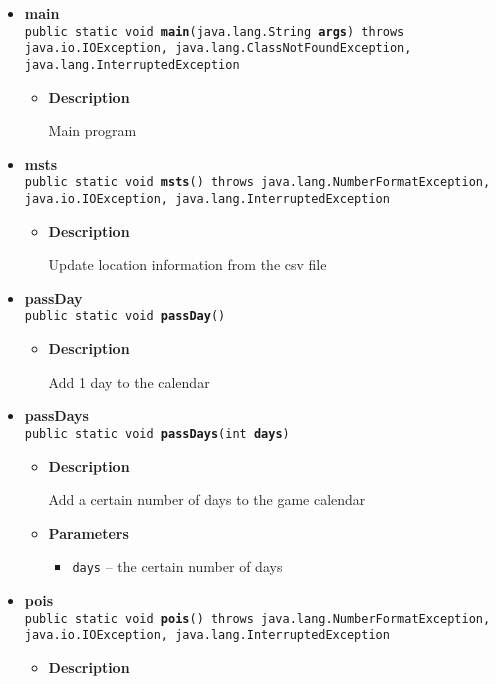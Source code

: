{{{{{{\begin{itemize}
{\begin{itemize}
{Update location information from the csv file
}
\end{itemize}
}%
\item{ 
{\bf  main}\\
\texttt{public static void\ {\bf  main}(\texttt{java.lang.String\lbrack \rbrack } {\bf  args}) throws java.io.IOException, java.lang.ClassNotFoundException, java.lang.InterruptedException
\label{personOfInterest.Game.main(java.lang.String[])}}%
\begin{itemize}
\item{
{\bf  Description}

Main program
}
\end{itemize}
}%
\item{ 
{\bf  msts}\\
\texttt{public static void\ {\bf  msts}() throws java.lang.NumberFormatException, java.io.IOException, java.lang.InterruptedException
\label{personOfInterest.Game.msts()}}%
\begin{itemize}
\item{
{\bf  Description}

Update location information from the csv file
}
\end{itemize}
}%
\item{ 
{\bf  passDay}\\
\texttt{public static void\ {\bf  passDay}()
\label{personOfInterest.Game.passDay()}}%
\begin{itemize}
\item{
{\bf  Description}

Add 1 day to the calendar
}
\end{itemize}
}%
\item{ 
{\bf  passDays}\\
\texttt{public static void\ {\bf  passDays}(\texttt{int} {\bf  days})
\label{personOfInterest.Game.passDays(int)}}%
\begin{itemize}
\item{
{\bf  Description}

Add a certain number of days to the game calendar
}
\item{
{\bf  Parameters}
  \begin{itemize}
   \item{
\texttt{days} -- the certain number of days}
  \end{itemize}
}%
\end{itemize}
}%
\item{ 
{\bf  pois}\\
\texttt{public static void\ {\bf  pois}() throws java.lang.NumberFormatException, java.io.IOException, java.lang.InterruptedException
\label{personOfInterest.Game.pois()}}%
\begin{itemize}
\item{
{\bf  Description}

}
\end{itemize}}
\end{itemize}}}}}}}
